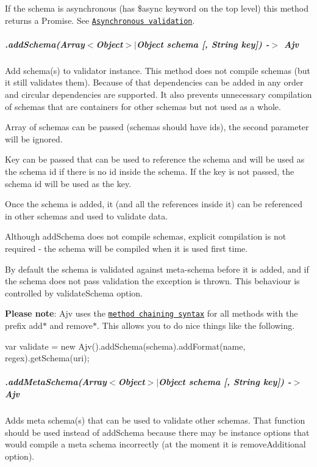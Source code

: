 If the schema is asynchronous (has {\ttfamily \$async} keyword on the top level) this method returns a Promise. See \href{#asynchronous-validation}{\tt Asynchronous validation}.

\subparagraph*{.add\+Schema(Array$<$Object$>$$\vert$\+Object schema \mbox{[}, String key\mbox{]}) -\/$>$ Ajv}

Add schema(s) to validator instance. This method does not compile schemas (but it still validates them). Because of that dependencies can be added in any order and circular dependencies are supported. It also prevents unnecessary compilation of schemas that are containers for other schemas but not used as a whole.

Array of schemas can be passed (schemas should have ids), the second parameter will be ignored.

Key can be passed that can be used to reference the schema and will be used as the schema id if there is no id inside the schema. If the key is not passed, the schema id will be used as the key.

Once the schema is added, it (and all the references inside it) can be referenced in other schemas and used to validate data.

Although {\ttfamily add\+Schema} does not compile schemas, explicit compilation is not required -\/ the schema will be compiled when it is used first time.

By default the schema is validated against meta-\/schema before it is added, and if the schema does not pass validation the exception is thrown. This behaviour is controlled by {\ttfamily validate\+Schema} option.

{\bfseries Please note}\+: Ajv uses the \href{https://en.wikipedia.org/wiki/Method_chaining}{\tt method chaining syntax} for all methods with the prefix {\ttfamily add$\ast$} and {\ttfamily remove$\ast$}. This allows you to do nice things like the following.


\begin{DoxyCode}
var validate = new Ajv().addSchema(schema).addFormat(name, regex).getSchema(uri);
\end{DoxyCode}


\subparagraph*{.add\+Meta\+Schema(Array$<$Object$>$$\vert$\+Object schema \mbox{[}, String key\mbox{]}) -\/$>$ Ajv}

Adds meta schema(s) that can be used to validate other schemas. That function should be used instead of {\ttfamily add\+Schema} because there may be instance options that would compile a meta schema incorrectly (at the moment it is {\ttfamily remove\+Additional} option).

